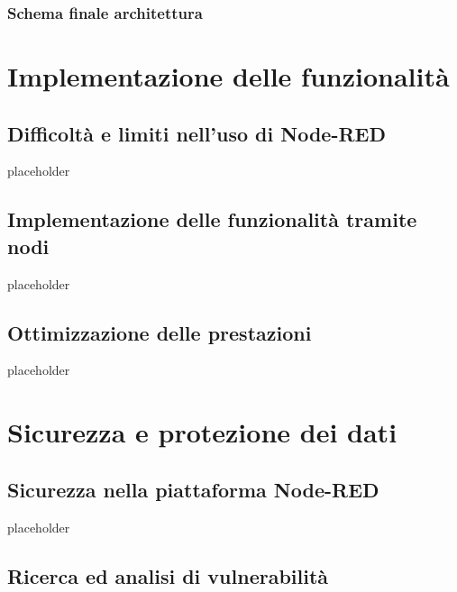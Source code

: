 \documentclass[a4paper,10pt]{memoir}
\begin{document}
\subsection{Schema finale architettura}

\clearpage

\chapter{Implementazione delle funzionalità}

\section{Difficoltà e limiti nell'uso di Node-RED}

placeholder

\clearpage

\section{Implementazione delle funzionalità tramite nodi}

placeholder

\clearpage

\section{Ottimizzazione delle prestazioni}

placeholder

\clearpage

\chapter{Sicurezza e protezione dei dati}

\section{Sicurezza nella piattaforma Node-RED}

placeholder

\clearpage

\section{Ricerca ed analisi di vulnerabilità}
\end{document}
